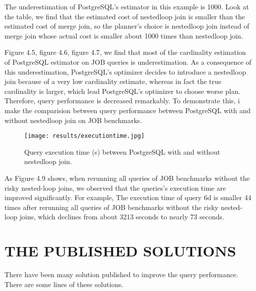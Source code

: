 The underestimation of PostgreSQL's estimator in this example is 1000. Look at the table, we find that the estimated cost of nestedloop join is smaller than the estimated cost of merge join, so the planner's choice is nestedloop join instead of merge join whose actual cost is smaller about 1000 times than nestedloop join. 

Figure 4.5, figure 4.6, figure 4.7, we find that most of the cardinality estimation of PostgreSQL estimator on JOB queries is underestimation. As a consequence of this underestimation, PostgreSQL's optimizer decides to introduce a nestedloop join because of a very low cardinality estimate, whereas in fact the true cardinality is larger, which lead PostgreSQL's optimizer to choose worse plan. Therefore, query performance is decreased remarkably. To demonstrate this, i make the comparision between query performance between PostgreSQL with and without nestedloop join on JOB benchmarks. 

\newpage
\begin{figure}[H]
	\centering
	\texttt{[image: results/executiontime.jpg]}
	\caption{Query execution time (s) between  PostgreSQL with and without nestedloop join.}
\end{figure}

As Figure 4.9 shows, when rerunning all queries of JOB benchmarks without the risky nested-loop joins, we observed that the queries's execution time are improved significantly. For example, The execution time of query 6d is smaller 44 times after rerunning all queries of JOB benchmarks without the risky nested-loop joins, which declines from about 3213 seconds to nearly 73 seconds.

\section{THE PUBLISHED SOLUTIONS}

There have been many solution published to improve the query performance. There are some lines of these solutions.

